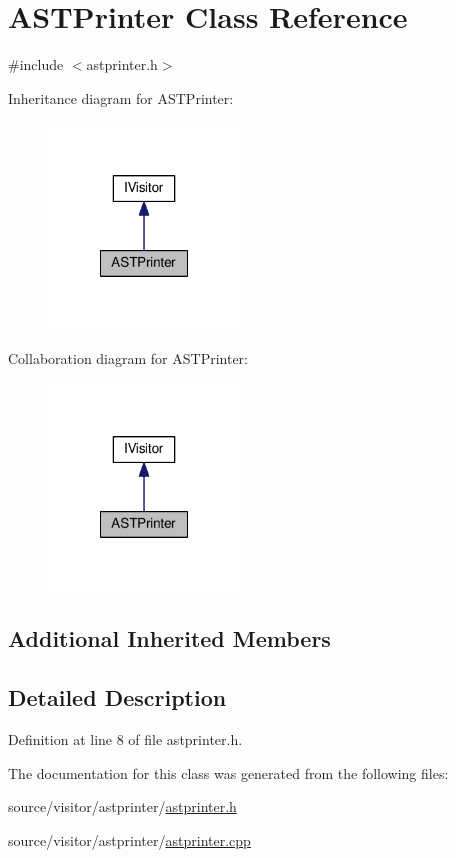 \hypertarget{class_a_s_t_printer}{\section{A\-S\-T\-Printer Class Reference}
\label{class_a_s_t_printer}
}


{\ttfamily \#include $<$astprinter.\-h$>$}



Inheritance diagram for A\-S\-T\-Printer\-:
\nopagebreak
\begin{figure}[H]
\begin{center}
\leavevmode
\includegraphics[width=144pt]{class_a_s_t_printer__inherit__graph}
\end{center}
\end{figure}


Collaboration diagram for A\-S\-T\-Printer\-:
\nopagebreak
\begin{figure}[H]
\begin{center}
\leavevmode
\includegraphics[width=144pt]{class_a_s_t_printer__coll__graph}
\end{center}
\end{figure}
\subsection*{Additional Inherited Members}


\subsection{Detailed Description}


Definition at line 8 of file astprinter.\-h.



The documentation for this class was generated from the following files\-:\begin{DoxyCompactItemize}
\item 
source/visitor/astprinter/\hyperlink{astprinter_8h}{astprinter.\-h}\item 
source/visitor/astprinter/\hyperlink{astprinter_8cpp}{astprinter.\-cpp}\end{DoxyCompactItemize}
